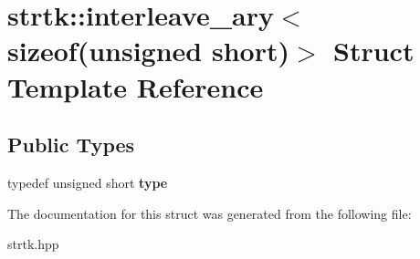 \hypertarget{structstrtk_1_1interleave__ary_3_01sizeof_07unsigned_01short_08_4}{\section{strtk\-:\-:interleave\-\_\-ary$<$ sizeof(unsigned short)$>$ Struct Template Reference}
\label{structstrtk_1_1interleave__ary_3_01sizeof_07unsigned_01short_08_4}
}
\subsection*{Public Types}
\begin{DoxyCompactItemize}
\item 
\hypertarget{structstrtk_1_1interleave__ary_3_01sizeof_07unsigned_01short_08_4_ac72c939b8d6c772004bac71b54a0208f}{typedef unsigned short {\bfseries type}}\label{structstrtk_1_1interleave__ary_3_01sizeof_07unsigned_01short_08_4_ac72c939b8d6c772004bac71b54a0208f}

\end{DoxyCompactItemize}


The documentation for this struct was generated from the following file\-:\begin{DoxyCompactItemize}
\item 
strtk.\-hpp\end{DoxyCompactItemize}
